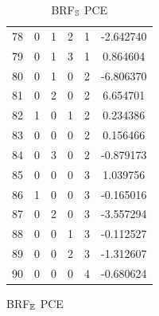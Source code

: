 \documentclass[preprint,12pt]{elsarticle}
\begin{document}
\begin{table}
\begin{minipage}[!h]{0.25\textwidth}
{\begin{tabular}{|c|cccc|c|}
78 &   0 &   1 &   2 &   1 &  -2.642740 \\
79 &   0 &   1 &   3 &   1 &   0.864604 \\
80 &   0 &   1 &   0 &   2 &  -6.806370 \\
81 &   0 &   2 &   0 &   2 &   6.654701 \\
82 &   1 &   0 &   1 &   2 &   0.234386 \\
83 &   0 &   0 &   0 &   2 &   0.156466 \\
84 &   0 &   3 &   0 &   2 &  -0.879173 \\
85 &   0 &   0 &   0 &   3 &   1.039756 \\
86 &   1 &   0 &   0 &   3 &  -0.165016 \\
87 &   0 &   2 &   0 &   3 &  -3.557294 \\
88 &   0 &   0 &   1 &   3 &  -0.112527 \\
89 &   0 &   0 &   2 &   3 &  -1.312607 \\
90 &   0 &   0 &   0 &   4 &  -0.680624 \\
\hline
\end{tabular}}
\caption{BRF$_{\mathbb{E}}$ PCE}
%
%
\caption{BRF$_{\mathbb{S}}$ PCE}
%
%
\end{minipage}
\end{table}
\end{document}
